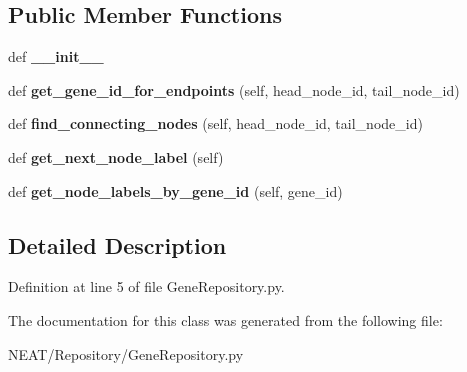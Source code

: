 \subsection*{Public Member Functions}
\begin{DoxyCompactItemize}
\item 
def {\bfseries \+\_\+\+\_\+init\+\_\+\+\_\+}\hypertarget{class_n_e_a_t___py_genetics_1_1_n_e_a_t_1_1_repository_1_1_gene_repository_1_1_gene_repository_a47867f001b69fb1af342bd56077eb2d1}{}\label{class_n_e_a_t___py_genetics_1_1_n_e_a_t_1_1_repository_1_1_gene_repository_1_1_gene_repository_a47867f001b69fb1af342bd56077eb2d1}

\item 
def {\bfseries get\+\_\+gene\+\_\+id\+\_\+for\+\_\+endpoints} (self, head\+\_\+node\+\_\+id, tail\+\_\+node\+\_\+id)\hypertarget{class_n_e_a_t___py_genetics_1_1_n_e_a_t_1_1_repository_1_1_gene_repository_1_1_gene_repository_acf117ca8d8fb85263ab1e419e795bc3f}{}\label{class_n_e_a_t___py_genetics_1_1_n_e_a_t_1_1_repository_1_1_gene_repository_1_1_gene_repository_acf117ca8d8fb85263ab1e419e795bc3f}

\item 
def {\bfseries find\+\_\+connecting\+\_\+nodes} (self, head\+\_\+node\+\_\+id, tail\+\_\+node\+\_\+id)\hypertarget{class_n_e_a_t___py_genetics_1_1_n_e_a_t_1_1_repository_1_1_gene_repository_1_1_gene_repository_a12b448287c1e00d71325a0f4f5191b0b}{}\label{class_n_e_a_t___py_genetics_1_1_n_e_a_t_1_1_repository_1_1_gene_repository_1_1_gene_repository_a12b448287c1e00d71325a0f4f5191b0b}

\item 
def {\bfseries get\+\_\+next\+\_\+node\+\_\+label} (self)\hypertarget{class_n_e_a_t___py_genetics_1_1_n_e_a_t_1_1_repository_1_1_gene_repository_1_1_gene_repository_a1cf66c6d6fbb68a38a5915ccfbab77cb}{}\label{class_n_e_a_t___py_genetics_1_1_n_e_a_t_1_1_repository_1_1_gene_repository_1_1_gene_repository_a1cf66c6d6fbb68a38a5915ccfbab77cb}

\item 
def {\bfseries get\+\_\+node\+\_\+labels\+\_\+by\+\_\+gene\+\_\+id} (self, gene\+\_\+id)\hypertarget{class_n_e_a_t___py_genetics_1_1_n_e_a_t_1_1_repository_1_1_gene_repository_1_1_gene_repository_a135cdf881aca932199a40ace71aa88e2}{}\label{class_n_e_a_t___py_genetics_1_1_n_e_a_t_1_1_repository_1_1_gene_repository_1_1_gene_repository_a135cdf881aca932199a40ace71aa88e2}

\end{DoxyCompactItemize}


\subsection{Detailed Description}


Definition at line 5 of file Gene\+Repository.\+py.



The documentation for this class was generated from the following file\+:\begin{DoxyCompactItemize}
\item 
N\+E\+A\+T/\+Repository/Gene\+Repository.\+py\end{DoxyCompactItemize}
